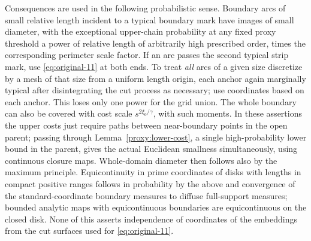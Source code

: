 Consequences are used in the following probabilistic sense.
Boundary arcs of small relative length incident to a typical boundary mark have images of small diameter, with the exceptional upper-chain probability at any fixed proxy threshold a power of relative length of arbitrarily high prescribed order, times the corresponding perimeter scale factor.
If an arc passes the second typical strip mark, use \eqref{eq:original-11} at both ends.
To treat \emph{all} arcs of a given size discretize by a mesh of that size from a uniform length origin, each anchor again marginally typical after disintegrating the cut process as necessary; use coordinates based on each anchor.
This loses only one power for the grid union.
The whole boundary can also be covered with cost scale \(s^{2\xi_0/\gamma}\), with such moments.
In these assertions the upper costs just require paths between near-boundary points in the open parent; passing through Lemma~\ref{proxy:lower-cost}, a single high-probability lower bound in the parent, gives the actual Euclidean smallness simultaneously, using continuous closure maps.
Whole-domain diameter then follows also by the maximum principle.
Equicontinuity in prime coordinates of disks with lengths in compact positive ranges follows in probability by the above and convergence of the standard-coordinate boundary measures to diffuse full-support measures; bounded analytic maps with equicontinuous boundaries are equicontinuous on the closed disk.
None of this asserts independence of coordinates of the embeddings from the cut surfaces used for \eqref{eq:original-11}.

